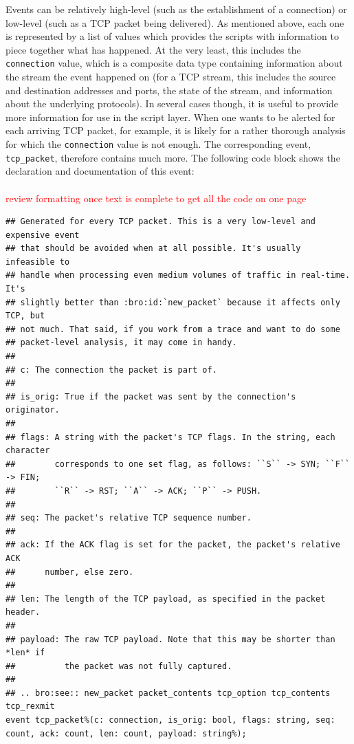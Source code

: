 \documentclass[12pt, a4paper, oneside]{article} %
\begin{document}
Events can be relatively high-level (such as the establishment of a connection) or low-level (such as a TCP packet being delivered). As mentioned above, each one is represented by a list of values which provides the scripts with information to piece together what has happened. At the very least, this includes the \texttt{connection} value, which is a composite data type containing information about the stream the event happened on (for a TCP stream, this includes the source and destination addresses and ports, the state of the stream, and information about the underlying protocols). In several cases though, it is useful to provide more information for use in the script layer. When one wants to be alerted for each arriving TCP packet, for example, it is likely for a rather thorough analysis for which the \texttt{connection} value is not enough. The corresponding event, \texttt{tcp\_packet}, therefore contains much more. The following code block shows the declaration and documentation of this event: \\ \\

\textcolor{red}{review formatting once text is complete to get all the code on one page}
\begin{lstlisting}[frame=single]
## Generated for every TCP packet. This is a very low-level and expensive event
## that should be avoided when at all possible. It's usually infeasible to
## handle when processing even medium volumes of traffic in real-time.  It's
## slightly better than :bro:id:`new_packet` because it affects only TCP, but
## not much. That said, if you work from a trace and want to do some
## packet-level analysis, it may come in handy.
##
## c: The connection the packet is part of.
##
## is_orig: True if the packet was sent by the connection's originator.
##
## flags: A string with the packet's TCP flags. In the string, each character
##        corresponds to one set flag, as follows: ``S`` -> SYN; ``F`` -> FIN;
##        ``R`` -> RST; ``A`` -> ACK; ``P`` -> PUSH.
##
## seq: The packet's relative TCP sequence number.
##
## ack: If the ACK flag is set for the packet, the packet's relative ACK
##      number, else zero.
##
## len: The length of the TCP payload, as specified in the packet header.
##
## payload: The raw TCP payload. Note that this may be shorter than *len* if
##          the packet was not fully captured.
##
## .. bro:see:: new_packet packet_contents tcp_option tcp_contents tcp_rexmit
event tcp_packet%(c: connection, is_orig: bool, flags: string, seq: count, ack: count, len: count, payload: string%);
\end{lstlisting}
\end{document}
